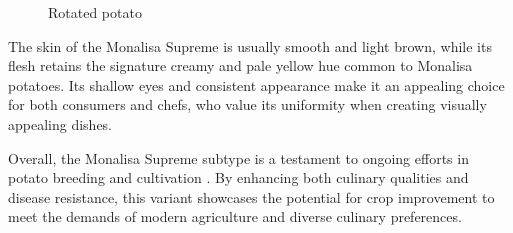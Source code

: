 \documentclass[../../../../main.tex]{subfiles}
\begin{document}
\begin{figure}[!htbp]
    \centering
    \caption{Rotated potato}
\end{figure}







The skin of the Monalisa Supreme is usually smooth and light brown, while its flesh retains the signature creamy and pale yellow hue common to Monalisa potatoes. Its shallow eyes and consistent appearance make it an appealing choice for both consumers and chefs, who value its uniformity when creating visually appealing dishes. \citep{yan_isotropic_2008}

Overall, the Monalisa Supreme subtype is a testament to ongoing efforts in potato breeding and cultivation \cite{du_vector-based_2017}. By enhancing both culinary qualities and disease resistance, this variant showcases the potential for crop improvement to meet the demands of modern agriculture and diverse culinary preferences.




\end{document}

